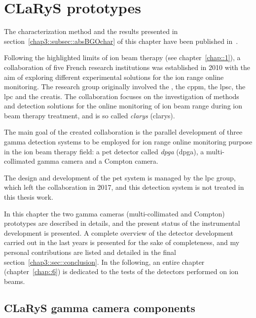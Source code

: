 \chapter{CLaRyS prototypes}\label{chap::3}

The characterization method and the results presented in section~\ref{chap3::subsec::absBGOchar} of this chapter have been published in~\cite{Fontana2018}.

\vfill

\minitoc

\newpage

\glsresetall

Following the highlighted limits of ion beam therapy (see chapter~\ref{chap::1}), a collaboration of five French research institutions was established in 2010 with the aim of exploring different experimental solutions for the ion range online monitoring. The research group originally involved the , the \gls{cppm}, the \gls{lpsc}, the \gls{lpc} and the \gls{creatis}. The collaboration focuses on the investigation of methods and detection solutions for the online monitoring of ion beam range during ion beam therapy treatment, and is so called \textit{\glsdesc{clarys}} (\acrshort{clarys}).

The main goal of the created collaboration is the parallel development of three gamma detection systems to be employed for ion range online monitoring purpose in the ion beam therapy field: a \gls{pet} detector called \textit{\glsdesc{dpga}} (\acrshort{dpga}), a multi-collimated gamma camera and a Compton camera.

The design and development of the \gls{pet} system is managed by the \gls{lpc} group, which left the collaboration in 2017, and this detection system is not treated in this thesis work.

In this chapter the two gamma cameras (multi-collimated and Compton) prototypes are described in details, and the present status of the instrumental development is presented. A complete overview of the detector development carried out in the last years is presented for the sake of completeness, and my personal contributions are listed and detailed in the final section~\ref{chap3::sec::conclusion}. In the following, an entire chapter (chapter~\ref{chap::6}) is dedicated to the tests of the detectors performed on ion beams. 

\section{CLaRyS gamma camera components}\label{chap3::sec::CLaRyScameras}

